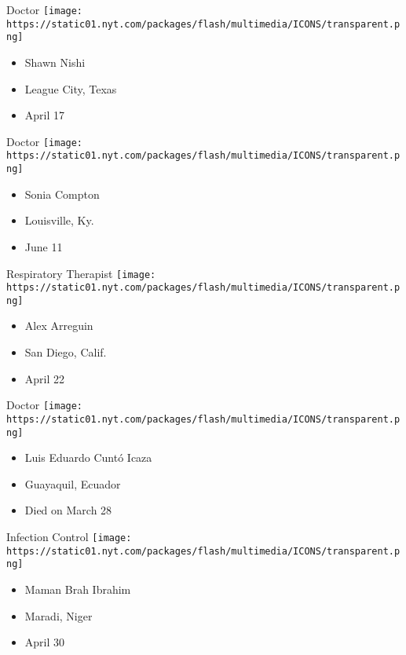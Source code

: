 \protect\hyperlink{item-shawn-nishi}{}

Doctor
\texttt{[image: https://static01.nyt.com/packages/flash/multimedia/ICONS/transparent.png]}

\begin{itemize}
\tightlist
\item
  Shawn Nishi
\item
  League City, Texas
\item
  April 17
\end{itemize}

\protect\hyperlink{item-sonia-compton}{}

Doctor
\texttt{[image: https://static01.nyt.com/packages/flash/multimedia/ICONS/transparent.png]}

\begin{itemize}
\tightlist
\item
   Sonia Compton
\item
  Louisville, Ky.
\item
  June 11
\end{itemize}

\protect\hyperlink{item-alex-arreguin}{}

Respiratory Therapist
\texttt{[image: https://static01.nyt.com/packages/flash/multimedia/ICONS/transparent.png]}

\begin{itemize}
\tightlist
\item
  Alex Arreguin
\item
  San Diego, Calif.
\item
  April 22
\end{itemize}

\protect\hyperlink{item-luis-eduardo-cunto-icaza}{}

Doctor
\texttt{[image: https://static01.nyt.com/packages/flash/multimedia/ICONS/transparent.png]}

\begin{itemize}
\tightlist
\item
  Luis Eduardo Cuntó Icaza
\item
  Guayaquil, Ecuador
\item
  Died on March 28
\end{itemize}

\protect\hyperlink{item-maman-brah-ibrahim}{}

Infection Control
\texttt{[image: https://static01.nyt.com/packages/flash/multimedia/ICONS/transparent.png]}

\begin{itemize}
\tightlist
\item
  Maman Brah Ibrahim
\item
  Maradi, Niger
\item
  April 30
\end{itemize}

